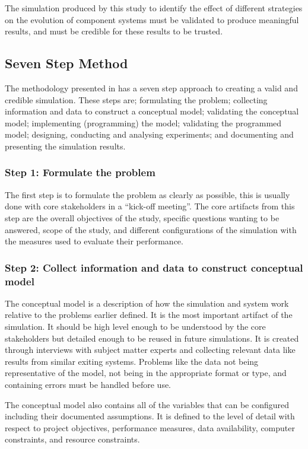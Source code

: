The simulation produced by this study to identify the effect of different strategies on the evolution of component systems must be validated to produce meaningful results,
and must be credible for these results to be trusted.

\subsection{Seven Step Method}
The methodology presented in \citep{Law2005} has a seven step approach to creating a valid and credible simulation.
These steps are; formulating the problem; collecting information and data to construct a conceptual model; validating the conceptual model;
implementing (programming) the model; validating the programmed model; designing, conducting and analysing experiments; and documenting and presenting the simulation results.

\subsubsection{Step 1: Formulate the problem}
The first step is to formulate the problem as clearly as possible, this is usually done with core stakeholders in a ``kick-off meeting''.
The core artifacts from this step are the overall objectives of the study, specific questions wanting to be answered, scope of the study,
 and different configurations of the simulation with the measures used to evaluate their performance. 

\subsubsection{Step 2: Collect information and data to construct conceptual model}
The conceptual model is a description of how the simulation and system work relative to the problems earlier defined.
It is the most important artifact of the simulation.
It should be high level enough to be understood by the core stakeholders but detailed enough to be reused in future simulations.
It is created through interviews with subject matter experts and collecting relevant data like results from similar exiting systems.
Problems like the data not being representative of the model, not being in the appropriate format or type, and containing errors must be handled before use.

The conceptual model also contains all of the variables that can be configured including their documented assumptions. 
It is defined to the level of detail with respect to project objectives, performance measures, data availability, computer constraints, and resource constraints.

